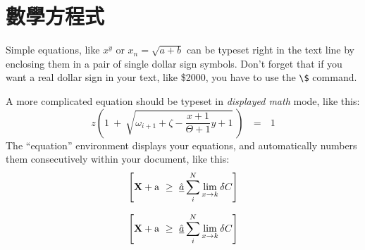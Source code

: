 \documentclass{article}
\begin{document}
\section {數學方程式}
Simple equations, like $x^y$ or $x_n = \sqrt{a + b}$ can be typeset right
in the text line by enclosing them in a pair of single dollar sign symbols.
Don't forget that if you want a real dollar sign in your text, like \$2000,
you have to use the \verb+\$+ command.

A more complicated equation should be typeset in {\em displayed math\/} mode,
like this:
\[
z \left( 1 \ +\ \sqrt{\omega_{i+1} + \zeta -\frac{x+1}{\Theta +1} y + 1}
\ \right)
\ \ \ =\ \ \ 1
\]
The ``equation'' environment displays your equations, and automatically
numbers them consecutively within your document, like this:
\begin{equation}
\left[
{\bf X} + {\rm a} \ \geq\
\underline{\hat a} \sum_i^N \lim_{x \rightarrow k} \delta C
\right]
\end{equation}

\begin{equation}
\left[
{\bf X} + {\rm a} \ \geq\
\underline{\hat a} \sum_i^N \lim_{x \rightarrow k} \delta C
\right]
\end{equation}
\end{document}
